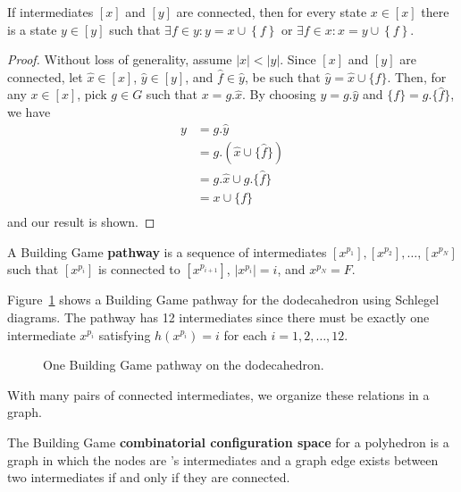 \begin{mylem}
If intermediates $\left[x\right]$ and $\left[y\right]$ are connected, then for every state $x \in \left[x\right]$ there is a state $y \in \left[y\right]$ such that $\exists f \in y: y = x \cup \left\{f\right\}$ or $\exists f \in x: x = y \cup \left\{f\right\}$.
\end{mylem}
\begin{proof}
  Without loss of generality, assume $|x| < |y|$. Since $[x]$ and $[y]$ are connected, let $\hat{x} \in [x]$, $\hat{y} \in [y]$, and $\hat{f} \in \hat{y}$, be such that $\hat{y} = \hat{x}\cup\{\hat{f}\}$. Then, for any $x \in [x]$, pick $g \in G$ such that $x = g.\hat{x}$. By choosing $y = g.\hat{y}$ and $\{f\} = g.\{\hat{f}\}$, we have
\begin{align}
  y &= g.\hat{y} \\
  &= g.(\hat{x}\cup\{\hat{f}\}) \\
  &= g.\hat{x}\cup g.\{\hat{f}\} \\
  &= x \cup \{f\} \\
\end{align}    
and our result is shown.
\end{proof}


\begin{mydef}
A Building Game \textbf{pathway} is a sequence of intermediates $[x^{p_1}], [x^{p_2}], \dots, [x^{p_N}]$ such that  $[x^{p_i}]$ is connected to $[x^{p_{i+1}}]$, $|x^{p_i}| = i$, and $x^{p_N} = F$.
\end{mydef}

 Figure~\ref{fig:DodecBG} shows a Building Game pathway for the dodecahedron using Schlegel diagrams. The pathway has 12 intermediates since there must be exactly one intermediate $x^{p_i}$ satisfying $h\left(x^{p_i}\right) = i$ for each $i = 1,2,\dots,12$.

\begin{figure}[ht]
\caption{One Building Game pathway on the dodecahedron.}
\label{fig:DodecBG}
\end{figure}

With many pairs of connected intermediates, we organize these relations in a graph.

\begin{mydef}
The Building Game \textbf{combinatorial configuration space} for a polyhedron \poly\spc is a graph in which the nodes are \poly's intermediates and a graph edge exists between two intermediates if and only if they are connected. 
\end{mydef}

